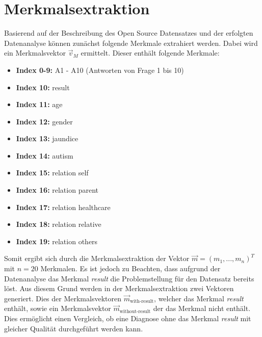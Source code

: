 \section{Merkmalsextraktion}
Basierend auf der Beschreibung des Open Source Datensatzes und der erfolgten Datenanalyse können zunächst folgende Merkmale extrahiert werden. Dabei wird ein Merkmalsvektor $\vec{v}_M$ ermittelt. Dieser enthält folgende Merkmale:

\begin{itemize}
	\item \textbf{Index 0-9:} A1 - A10 (Antworten von Frage 1 bis 10)
	\item \textbf{Index 10:} result
	\item \textbf{Index 11:} age 
	\item \textbf{Index 12:} gender
	\item \textbf{Index 13:} jaundice
	\item \textbf{Index 14:} autism
	\item \textbf{Index 15:} relation self
	\item \textbf{Index 16:} relation parent
	\item \textbf{Index 17:} relation healthcare
	\item \textbf{Index 18:} relation relative
	\item \textbf{Index 19:} relation others
\end{itemize}

Somit ergibt sich durch die Merkmalsextraktion der Vektor $\vec{m} = (m_1, ..., m_n)^T$ mit $n = 20$ Merkmalen. Es ist jedoch zu Beachten, dass aufgrund der Datenanalyse das Merkmal \textit{result} die Problemstellung für den Datensatz bereits löst. Aus diesem Grund werden in der Merkmalsextraktion zwei Vektoren generiert. Dies der Merkmalsvektoren $\vec{m}_{\text{with-result}}$, welcher das Merkmal \textit{result} enthält, sowie ein Merkmalsvektor $\vec{m}_{\text{without-result}}$ der das Merkmal nicht enthält. Dies ermöglicht einen Vergleich, ob eine Diagnose ohne das Merkmal \textit{result} mit gleicher Qualität durchgeführt werden kann.
